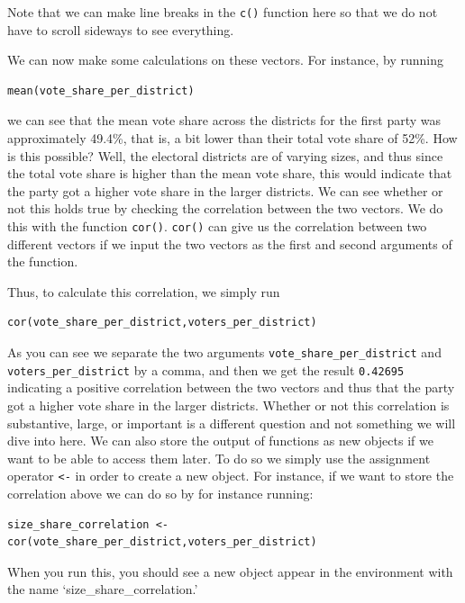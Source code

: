 \documentclass[
]{book}
\begin{document}
Note that we can make line breaks in the \texttt{c()} function here so that we do not have to scroll sideways to see everything.

We can now make some calculations on these vectors. For instance, by running

\begin{verbatim}
mean(vote_share_per_district)
\end{verbatim}

we can see that the mean vote share across the districts for the first party was approximately 49.4\%, that is, a bit lower than their total vote share of 52\%. How is this possible? Well, the electoral districts are of varying sizes, and thus since the total vote share is higher than the mean vote share, this would indicate that the party got a higher vote share in the larger districts. We can see whether or not this holds true by checking the correlation between the two vectors. We do this with the function \texttt{cor()}. \texttt{cor()} can give us the correlation between two different vectors if we input the two vectors as the first and second arguments of the function.

Thus, to calculate this correlation, we simply run

\begin{verbatim}
cor(vote_share_per_district,voters_per_district)
\end{verbatim}

As you can see we separate the two arguments \texttt{vote\_share\_per\_district} and \texttt{voters\_per\_district} by a comma, and then we get the result \texttt{0.42695} indicating a positive correlation between the two vectors and thus that the party got a higher vote share in the larger districts. Whether or not this correlation is substantive, large, or important is a different question and not something we will dive into here. We can also store the output of functions as new objects if we want to be able to access them later. To do so we simply use the assignment operator \texttt{\textless{}-} in order to create a new object. For instance, if we want to store the correlation above we can do so by for instance running:

\begin{verbatim}
size_share_correlation <- cor(vote_share_per_district,voters_per_district)
\end{verbatim}

When you run this, you should see a new object appear in the environment with the name `size\_share\_correlation.'
\end{document}
